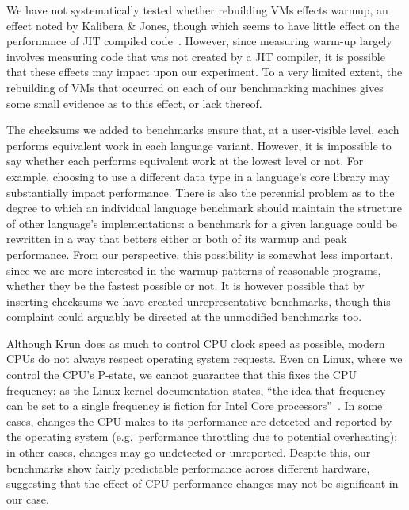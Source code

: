 \documentclass[preprint,numbers,10pt]{sigplanconf}
\newcommand{\kalibera}{Kalibera \& Jones\xspace}
\newcommand{\krun}{Krun\xspace}
\begin{document}
We have not systematically tested whether rebuilding VMs effects warmup, an
effect noted by \kalibera, though which seems to have little effect on
the performance of JIT compiled code~\cite{barrett15approaches}. However, since measuring warm-up largely
involves measuring code that was not created by a JIT compiler, it is possible
that these effects may impact upon our experiment. To a very limited extent, the
rebuilding of VMs that occurred on each of our benchmarking machines gives
some small evidence as to this effect, or lack thereof.

The checksums we added to benchmarks ensure that, at a user-visible level, each
performs equivalent work in each language variant. However, it is impossible to
say whether each performs equivalent work at the lowest level or not. For
example, choosing to use a different data type in a language's core library may
substantially impact performance. There is also the perennial problem as to the
degree to which an individual language benchmark should maintain the structure
of other language's implementations: a benchmark for a given language could be
rewritten in a way that betters either or both of its warmup and peak
performance. From our perspective, this possibility is somewhat less important,
since we are more interested in the warmup patterns of reasonable programs,
whether they be the fastest possible or not. It is however possible that by
inserting checksums we have created unrepresentative benchmarks, though
this complaint could arguably be directed at the unmodified benchmarks too.

 Although \krun does as much to control CPU clock speed as possible, modern CPUs
do not always respect operating system requests. Even on Linux, where we control
the CPU's P-state, we cannot guarantee that this fixes the CPU frequency: as
the Linux kernel documentation states, ``the idea that frequency can be set to a single
frequency is fiction for Intel Core processors''~\cite{pstate}. In
some cases, changes the CPU makes to its performance are detected and reported
by the operating system (e.g.~performance throttling due to potential
overheating); in other cases, changes may go undetected or unreported.
Despite this, our benchmarks show fairly predictable performance across
different hardware, suggesting that the effect of CPU performance changes may
not be significant in our case.
\end{document}
